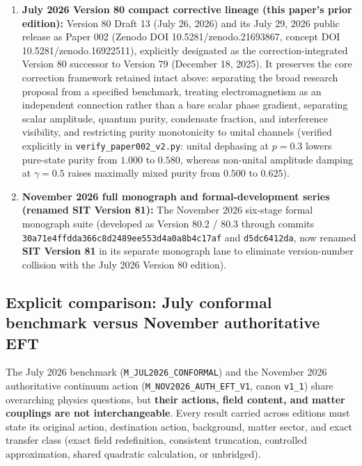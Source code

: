 \documentclass[
  american,
  11pt,
  letterpaper,
]{article}
\providecommand{\tightlist}{%
  \setlength{\itemsep}{0pt}\setlength{\parskip}{0pt}}
\begin{document}
\begin{enumerate}
\def\labelenumi{\arabic{enumi}.}
\tightlist
\item
  \textbf{July 2026 Version 80 compact corrective lineage (this paper's prior edition):} Version 80 Draft 13 (July 26, 2026) and its July 29, 2026 public release as Paper 002 (Zenodo DOI 10.5281/zenodo.21693867, concept DOI 10.5281/zenodo.16922511), explicitly designated as the correction-integrated Version 80 successor to Version 79 (December 18, 2025). It preserves the core correction framework retained intact above: separating the broad research proposal from a specified benchmark, treating electromagnetism as an independent connection rather than a bare scalar phase gradient, separating scalar amplitude, quantum purity, condensate fraction, and interference visibility, and restricting purity monotonicity to unital channels (verified explicitly in \nolinkurl{verify_paper002_v2.py}: unital dephasing at \(p = 0.3\) lowers pure-state purity from \(1.000\) to \(0.580\), whereas non-unital amplitude damping at \(\gamma = 0.5\) raises maximally mixed purity from \(0.500\) to \(0.625\)).
\item
  \textbf{November 2026 full monograph and formal-development series (renamed SIT Version 81):} The November 2026 six-stage formal monograph suite (developed as Version 80.2 / 80.3 through commits \nolinkurl{30a71e4ffdda366c8d2489ee553d4a0a8b4c17af} and \texttt{d5dc6412da}, now renamed \textbf{SIT Version 81} in its separate monograph lane to eliminate version-number collision with the July 2026 Version 80 edition).
\end{enumerate}

\subsection{Explicit comparison: July conformal benchmark versus November authoritative EFT}\label{explicit-comparison-july-conformal-benchmark-versus-november-authoritative-eft}

The July 2026 benchmark (\nolinkurl{M_JUL2026_CONFORMAL}) and the November 2026 authoritative continuum action (\nolinkurl{M_NOV2026_AUTH_EFT_V1}, canon \texttt{v1\_1}) share overarching physics questions, but \textbf{their actions, field content, and matter couplings are not interchangeable}. Every result carried across editions must state its original action, destination action, background, matter sector, and exact transfer class (exact field redefinition, consistent truncation, controlled approximation, shared quadratic calculation, or unbridged).
\end{document}
